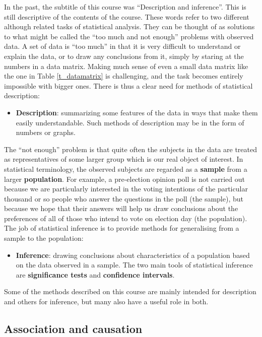 In the past, the subtitle of this course was ``Description and
inference''. This is still descriptive
of the contents of the course. These words
refer to two different although related tasks of statistical
analysis. They can be thought of as solutions to what might be called
the ``too much and not enough'' problems with observed data. A set of
data is ``too much'' in that it is very difficult to understand or
explain the data,  or to draw any conclusions from it, simply by staring
at the numbers in a data matrix. Making much sense of even a small data
matrix like the one in Table \ref{t_datamatrix} is challenging, and the
task becomes entirely impossible with bigger ones.
There is thus a clear need for methods of statistical
description:
\begin{itemize}
\item
\textbf{Description}: summarizing some features of the data in ways that
make them easily understandable. Such methods of description may be in
the form of numbers or graphs.
\end{itemize}
The ``not enough'' problem is that quite often the subjects in
the data are treated as representatives of some larger group which is
our real object of interest. In statistical terminology, the observed
subjects are regarded as a \textbf{sample} from a larger
\textbf{population}.
For example, a pre-election opinion poll is not carried out because we are
particularly interested in the voting intentions of the particular
thousand or so people who answer the questions in the poll (the sample),
but because we hope that their answers will help us draw
conclusions about the preferences of all of those who intend to
vote on election day (the population). The job of statistical
inference is to provide methods for generalising from a sample to the
population:
\begin{itemize}
\item
\textbf{Inference}: drawing conclusions about characteristics of a
population based on the data observed in a sample. The two main
tools of statistical inference are \textbf{significance tests} and
\textbf{confidence intervals}.
\end{itemize}
Some of the methods described on this course are mainly intended for
description and others for inference, but many also have a useful
role in both.

\subsection{Association and causation}
\label{ss_intro_def_assoc}

